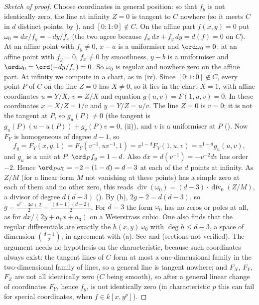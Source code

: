 \begin{proof}[Sketch of proof]
Choose coordinates in general position: so that $f_y$ is not identically zero, the line at infinity $Z=0$ is tangent to $C$ nowhere (so it meets $C$ in $d$
distinct points, by ), and $[0:1:0]\notin C$. On the affine part $f(x,y)=0$ put
$\omega_0=dx/f_y=-dy/f_x$ (the two agree because $f_x\,dx+f_y\,dy=d(f)=0$ on $C$). At an affine point with $f_y\ne0$, $x-a$ is a uniformiser and
$\ord\omega_0=0$; at an affine point with $f_y=0$, $f_x\ne0$ by smoothness, $y-b$ is a uniformiser and $\ord\omega_0=\ord(-dy/f_x)=0$. So $\omega_0$ is regular
and nowhere zero on the affine part. At infinity we compute in a chart, as in (iv). Since $[0:1:0]\notin C$, every point
$P$ of $C$ on the line $Z=0$ has $X\ne0$, so it lies in the chart $X=1$, with affine coordinates $u=Y/X$, $v=Z/X$ and equation $g(u,v)=F(1,u,v)=0$. In
these coordinates $x=X/Z=1/v$ and $y=Y/Z=u/v$. The line $Z=0$ is $v=0$; it is not the tangent at $P$, so $g_u(P)\ne0$ (the tangent is
$g_u(P)(u-u(P))+g_v(P)v=0$, (ii)), and $v$ is a uniformiser at $P$ (). Now $F_Y$ is homogeneous of degree
$d-1$, so
\[
f_y=F_Y(x,y,1)=F_Y(v^{-1},uv^{-1},1)=v^{1-d}F_Y(1,u,v)=v^{1-d}g_u(u,v),
\]
and $g_u$ is a unit at $P$: $\ord_Pf_y=1-d$. Also $dx=d(v^{-1})=-v^{-2}dv$ has order $-2$. Hence $\ord_P\omega_0=-2-(1-d)=d-3$ at each of the $d$ points
at infinity. As $Z/M$ (for a linear form $M$ not vanishing at these points) has a simple zero at each of them and no other zero, this reads
$\operatorname{div}(\omega_0)=(d-3)\cdot\operatorname{div}_0(Z/M)$, a divisor of degree $d(d-3)$ (). By (b),
$2g-2=d(d-3)$, so $g=\frac{d^2-3d+2}2=\frac{(d-1)(d-2)}2$. For $d=3$ the form $\omega_0$ has no zeros or poles at all, as for $dx/(2y+a_1x+a_3)$ on a
Weierstrass cubic. One also finds that the regular
differentials are exactly the $h(x,y)\,\omega_0$ with $\deg h\le d-3$, a space of dimension $\binom{d-1}2$, in agreement with
(a). See \cite[Chapter 8]{Fulton} and \cite[Chapter IV, Section 1, and Chapter I, Section 7]{Hartshorne} (sections not
verified). The argument needs no hypothesis on the characteristic, because such coordinates always exist: the tangent lines of $C$ form at most a one-dimensional
family in the two-dimensional family of lines, so a general line is tangent nowhere; and $F_X$, $F_Y$, $F_Z$ are not all identically zero ($C$ being smooth), so
after a general linear change of coordinates $F_Y$, hence $f_y$, is not identically zero (in characteristic $p$ this can fail for special coordinates, when
$f\in k[x,y^p]$).
\end{proof}

